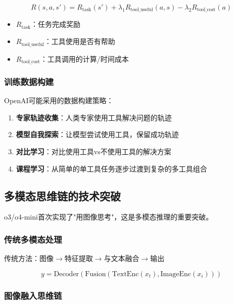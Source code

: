 \documentclass[12pt,a4paper]{article}
\begin{document}
\begin{equation}
R(s, a, s') = R_{\text{task}}(s') + \lambda_1 R_{\text{tool\_useful}}(a, s) - \lambda_2 R_{\text{tool\_cost}}(a)
\end{equation}

\begin{itemize}
    \item $R_{\text{task}}$：任务完成奖励
    \item $R_{\text{tool\_useful}}$：工具使用是否有帮助
    \item $R_{\text{tool\_cost}}$：工具调用的计算/时间成本
\end{itemize}

\subsubsection{训练数据构建}

OpenAI可能采用的数据构建策略：

\begin{enumerate}
    \item \textbf{专家轨迹收集}：人类专家使用工具解决问题的轨迹
    \item \textbf{模型自我探索}：让模型尝试使用工具，保留成功轨迹
    \item \textbf{对比学习}：对比使用工具vs不使用工具的解决方案
    \item \textbf{课程学习}：从简单的单工具任务逐步过渡到复杂的多工具组合
\end{enumerate}

\subsection{多模态思维链的技术突破}

o3/o4-mini首次实现了"用图像思考"，这是多模态推理的重要突破。

\subsubsection{传统多模态处理}

传统方法：图像$\rightarrow$特征提取$\rightarrow$与文本融合$\rightarrow$输出

\begin{equation}
y = \text{Decoder}(\text{Fusion}(\text{TextEnc}(x_t), \text{ImageEnc}(x_i)))
\end{equation}

\subsubsection{图像融入思维链}
\end{document}
